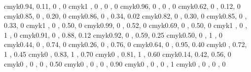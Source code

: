 \definecolor{cerulean}      {cmyk}{0.94, 0.11, 0   , 0   }
\definecolor{cyan}          {cmyk}{1   , 0   , 0   , 0   }
\definecolor{processblue}   {cmyk}{0.96, 0   , 0   , 0   }
\definecolor{skyblue}       {cmyk}{0.62, 0   , 0.12, 0   }
\definecolor{turquoise}     {cmyk}{0.85, 0   , 0.20, 0   }
\definecolor{tealblue}      {cmyk}{0.86, 0   , 0.34, 0.02}
\definecolor{aquamarine}    {cmyk}{0.82, 0   , 0.30, 0   }
\definecolor{bluegreen}     {cmyk}{0.85, 0   , 0.33, 0   }
\definecolor{emerald}       {cmyk}{1   , 0   , 0.50, 0   }
\definecolor{junglegreen}   {cmyk}{0.99, 0   , 0.52, 0   }
\definecolor{seagreen}      {cmyk}{0.69, 0   , 0.50, 0   }
\definecolor{green}         {cmyk}{1   , 0   , 1   , 0   }
\definecolor{forestgreen}   {cmyk}{0.91, 0   , 0.88, 0.12}
\definecolor{pinegreen}     {cmyk}{0.92, 0   , 0.59, 0.25}
\definecolor{limegreen}     {cmyk}{0.50, 0   , 1   , 0   }
\definecolor{yellowgreen}   {cmyk}{0.44, 0   , 0.74, 0   }
\definecolor{springgreen}   {cmyk}{0.26, 0   , 0.76, 0   }
\definecolor{olivegreen}    {cmyk}{0.64, 0   , 0.95, 0.40}
\definecolor{rawsienna}     {cmyk}{0   , 0.72, 1   , 0.45}
\definecolor{sepia}         {cmyk}{0   , 0.83, 1   , 0.70}
\definecolor{brown}         {cmyk}{0   , 0.81, 1   , 0.60}
\definecolor{tan}           {cmyk}{0.14, 0.42, 0.56, 0   }
\definecolor{gray}          {cmyk}{0   , 0   , 0   , 0.50}
\definecolor{darkgray}          {cmyk}{0   , 0   , 0   , 0.90}
\definecolor{black}         {cmyk}{0   , 0   , 0   , 1   }
\definecolor{white}         {cmyk}{0   , 0   , 0   , 0   }

\usepackage[hyphens]{url}
\usepackage[plainpages=false,pdfpagelabels,bookmarksnumbered,hyperindex,
        colorlinks=true, %
        linkcolor=sepia,
        citecolor=sepia,
        filecolor=maroon,
        urlcolor=sepia,
        breaklinks=true,
        unicode]{hyperref}
\usepackage{multirow}
        
\usepackage{thumbpdf}
\usepackage{breakurl}

